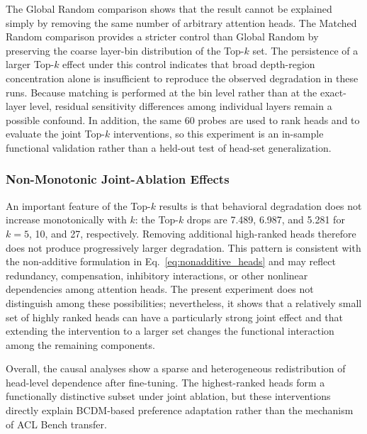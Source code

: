The Global Random comparison shows that the result cannot be explained simply by removing the same number of arbitrary attention heads. The Matched Random comparison provides a stricter control than Global Random by preserving the coarse layer-bin distribution of the Top-$k$ set. The persistence of a larger Top-$k$ effect under this control indicates that broad depth-region concentration alone is insufficient to reproduce the observed degradation in these runs. Because matching is performed at the bin level rather than at the exact-layer level, residual sensitivity differences among individual layers remain a possible confound. In addition, the same 60 probes are used to rank heads and to evaluate the joint Top-$k$ interventions, so this experiment is an in-sample functional validation rather than a held-out test of head-set generalization.

\FloatBarrier

\subsubsection{Non-Monotonic Joint-Ablation Effects}

An important feature of the Top-$k$ results is that behavioral degradation does not increase monotonically with $k$: the Top-$k$ drops are 7.489, 6.987, and 5.281 for $k=5$, 10, and 27, respectively. Removing additional high-ranked heads therefore does not produce progressively larger degradation. This pattern is consistent with the non-additive formulation in Eq.~\ref{eq:nonadditive_heads} and may reflect redundancy, compensation, inhibitory interactions, or other nonlinear dependencies among attention heads. The present experiment does not distinguish among these possibilities; nevertheless, it shows that a relatively small set of highly ranked heads can have a particularly strong joint effect and that extending the intervention to a larger set changes the functional interaction among the remaining components.

Overall, the causal analyses show a sparse and heterogeneous redistribution of head-level dependence after fine-tuning. The highest-ranked heads form a functionally distinctive subset under joint ablation, but these interventions directly explain BCDM-based preference adaptation rather than the mechanism of ACL Bench transfer.



